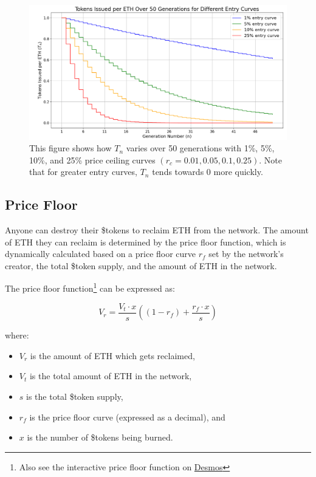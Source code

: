 \documentclass{article}
\begin{document}
\clearpage
\begin{figure}[h]
  \centering
  \includegraphics[width=\textwidth]{figures/multi-entry-curves.png}
  \caption{This figure shows how $T_n$ varies over 50 generations with 1\%, 5\%, 10\%, and 25\% price ceiling curves $(r_c = 0.01, 0.05, 0.1, 0.25)$. Note that for greater entry curves, $T_n$ tends towards 0 more quickly.}
\end{figure}

\subsection{Price Floor}

Anyone can destroy their \$tokens to reclaim ETH from the network. The amount of ETH they can reclaim is determined by the price floor function, which is dynamically calculated based on a price floor curve $r_f$ set by the network's creator, the total \$token supply, and the amount of ETH in the network.

The price floor function\footnote{Also see the interactive price floor function on \href{https://www.desmos.com/calculator/9pewqesyj5}{Desmos}} can be expressed as:

\begin{equation}
  V_r = \frac{V_t \cdot x}{s}\left(\left(1-r_f\right)+\frac{r_f \cdot x}{s}\right)
\end{equation}

where:
\begin{itemize}
  \item $V_r$ is the amount of ETH which gets reclaimed,
  \item $V_t$ is the total amount of ETH in the network,
  \item $s$ is the total \$token supply,
  \item $r_f$ is the price floor curve (expressed as a decimal), and
  \item $x$ is the number of \$tokens being burned.
\end{itemize}
\end{document}
